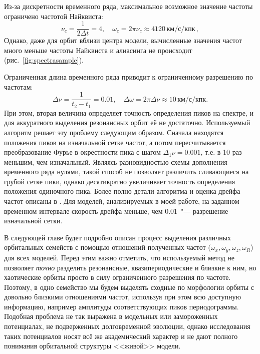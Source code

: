 \documentclass{trlnotes}
\begin{document}
Из-за дискретности временного ряда, максимальное возможное значение частоты ограничено частотой Найквиста: 
\[
  ν_c = \frac{1}{2 Δt} = 4, \quad ω_c = 2\pi ν_c \approx 4120\,\text{км}/\text{с}/\text{кпк}\,,
\]
Однако, даже для орбит вблизи центра модели, вычисленные значения частот много меньше частоты Найквиста
и алиасинга не происходит (рис.~\ref{fig:spectrasample}).

Ограниченная длина временного ряда приводит к ограниченному разрешению по частотам: 
\[
  Δν = \frac{1}{t_2 - t_1} = 0.01, \quad Δω = 2\pi Δν \approx 10\,\text{км}/\text{с}/\text{кпк}.
\]
При этом, вторая величина определяет точность определения пиков на спектре, и для аккуратного выделения резонансных
орбит её не достаточно.  Используемый алгоритм решает эту проблему следующим образом. Сначала находятся положения пиков
на изначальной сетке частот, а потом пересчитывается преобразование Фурье в окрестности пика с шагом $Δ_1ν = 0.001$, т.е. в 10 раз меньшим, чем изначальный.
Являясь разновидностью схемы дополнения временного ряда нулями, такой способ не позволяет различить сливающиеся на
грубой сетке пики, однако десятикратно увеличивает точность определения положения одиночного пика. Более полно детали
алгоритма и оценка дрейфа частот описаны в \citet{parul2020}. Для моделей, анализируемых в моей работе, на заданном
временном интервале скорость дрейфа меньше, чем $0.01$~"--- разрешение изначальной сетки.

В следующей главе будет подробно описан процесс выделения различных орбитальных семейств с помощью отношений полученных
частот ($ω_x, ω_y, ω_z, ω_R$) для всех моделей. Перед этим важно отметить, что используемый метод не позволяет
\emph{точно} разделить резонансные, квазипериодические и близкие к ним, но хаотические орбиты просто в силу
ограниченного разрешения по частоте. Поэтому, в одно семейство мы будем выделять сходные по морфологии орбиты с
довольно близкими отношениями частот, используя при этом всю доступную информацию, например амплитуды соответствующих
пиков периодограммы. Подобная проблема не так выражена в модельных или замороженных потенциалах, не подверженных
долговременной эволюции, однако исследования таких потенциалов носят всё же академический характер и не дают полного
понимания орбитальной структуры <<живой>> модели.
\end{document}
